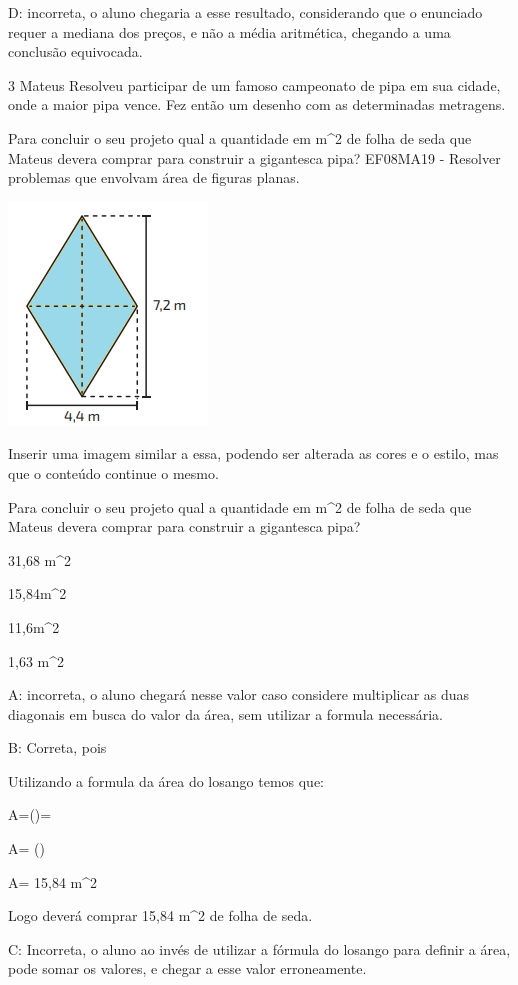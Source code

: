 D: incorreta, o aluno chegaria a esse resultado, considerando que o
enunciado requer a mediana dos preços, e não a média aritmética,
chegando a uma conclusão equivocada.

\num{3} Mateus Resolveu participar de um famoso campeonato de pipa em sua
cidade, onde a maior pipa vence. Fez então um desenho com as
determinadas metragens.

Para concluir o seu projeto qual a quantidade em m^2 de folha de seda que
Mateus devera comprar para construir a gigantesca pipa? EF08MA19 -
Resolver problemas que envolvam área de figuras planas.

\includegraphics[width=1\times 45833in,height=1\times 63333in]{./imgSAEB_8_MAT/media/image59.png}

Inserir uma imagem similar a essa, podendo ser alterada as cores e o
estilo, mas que o conteúdo continue o mesmo.

Para concluir o seu projeto qual a quantidade em m^2 de folha de seda que
Mateus devera comprar para construir a gigantesca pipa?

\item 31,68 m^2
\item 15,84m^2
\item 11,6m^2
\item 1,63 m^2

A: incorreta, o aluno chegará nesse valor caso considere multiplicar as
duas diagonais em busca do valor da área, sem utilizar a formula
necessária.

B: Correta, pois

Utilizando a formula da área do losango temos que:

A=()=

A= ()

A= 15,84 m^2

Logo deverá comprar 15,84 m^2 de folha de seda.

C: Incorreta, o aluno ao invés de utilizar a fórmula do losango para
definir a área, pode somar os valores, e chegar a esse valor
erroneamente.

